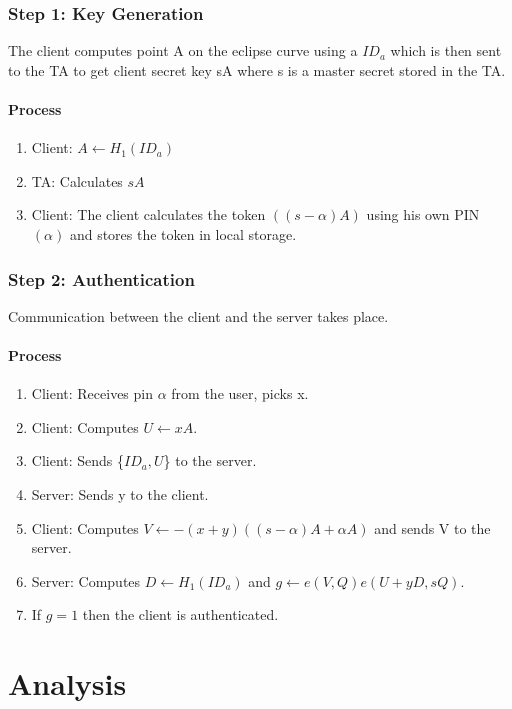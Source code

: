 \documentclass[]{article}   %
\begin{document}
\subsubsection*{Step 1: Key Generation}
The client computes point A on the eclipse curve using a $ID_a$ which is then sent to the TA to get client secret key sA where s is a master secret stored in the TA.
\paragraph*{Process}
\begin{enumerate}
    \item Client: $A \leftarrow H_1(ID_a) $
    \item TA: Calculates $sA$
    \item Client: The client calculates the token $((s-\alpha)A)$ using his own PIN $(\alpha)$ and stores the token in local storage.
\end{enumerate}
\subsubsection*{Step 2: Authentication}
Communication between the client and the server takes place.
\paragraph*{Process}
\begin{enumerate}
    \item Client: Receives pin $\alpha$ from the user, picks x.
    \item Client: Computes $U \leftarrow xA$.
    \item Client: Sends \{$ID_a, U$\} to the server.
    \item Server: Sends y to the client.
    \item Client: Computes $V \leftarrow -(x+y)((s-\alpha)A +\alpha A)$ and sends V to the server.
    \item Server: Computes $D \leftarrow H_1(ID_a)$ and \newline $g \leftarrow e(V,Q)e(U+yD,sQ)$.
    \item If $g = 1$ then the client is authenticated.
\end{enumerate}

\newpage
\section*{Analysis}
\end{document}
